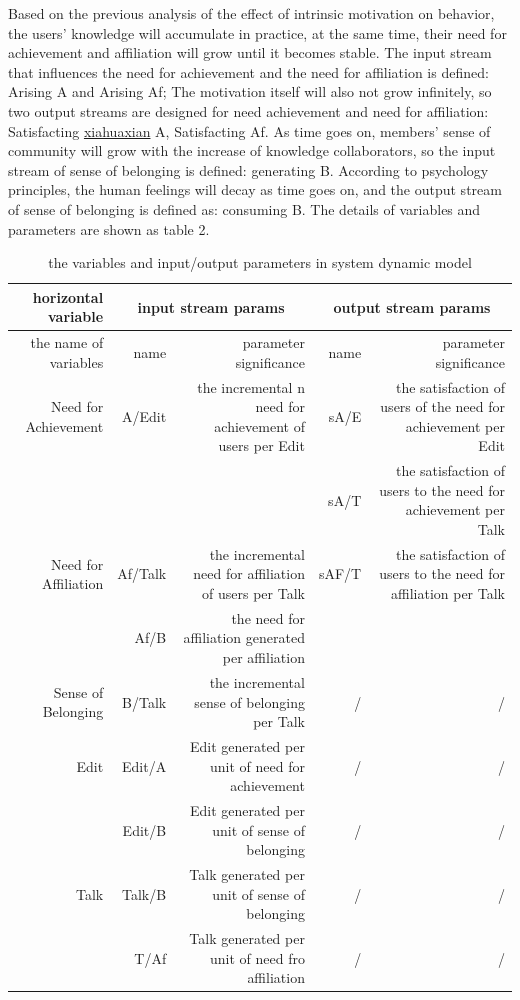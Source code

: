 \documentclass{elsarticle}
\begin{document}
Based on the previous analysis of the effect of intrinsic motivation
on behavior, the users’ knowledge will accumulate in practice, at the
same time, their need for achievement and affiliation will grow until
it becomes stable. The input stream that influences the need for
achievement and the need for affiliation is defined: Arising A and
Arising Af; The motivation itself will also not grow infinitely, so
two output streams are designed for need achievement and need for
affiliation: Satisfacting \underline{xiahuaxian} A, Satisfacting Af. As time goes on,
members’ sense of community will grow with the increase of knowledge
collaborators, so the input stream of sense of belonging is defined:
generating B. According to psychology principles, the human feelings
will decay as time goes on, and the output stream of sense of
belonging is defined as: consuming B. The details of variables and
parameters are shown as table 2. 
\begin{table}[htpb]
  \centering
 
  \caption{ the variables and input/output parameters in system
    dynamic model}
\begin{tabular}{rrrrr}
   
    \toprule
    horizontal variable & \multicolumn{ 2}{|c}{input stream params} &
    \multicolumn{ 2}{|c}{output stream params} \\
    \midrule
    the name of variables & name  & parameter significance & name  & parameter significance \\
    \multicolumn{ 1}{|r|}{Need for Achievement} & \multicolumn{ 1}{|r}{A/Edit} & \multicolumn{ 1}{r|}{the incremental n need for achievement of users per Edit} & sA/E  & the satisfaction of users of the need for achievement per Edit \\
    \multicolumn{ 1}{|r|}{} & \multicolumn{ 1}{|r}{} & \multicolumn{ 1}{r|}{} & sA/T  & the satisfaction of users to the need for achievement per Talk \\
    \multicolumn{ 1}{|r|}{Need for Affiliation} & Af/Talk & the incremental need for affiliation of users per Talk & \multicolumn{ 1}{|r}{sAF/T} & \multicolumn{ 1}{r|}{the satisfaction of users to the need for affiliation per Talk} \\
    \multicolumn{ 1}{|r|}{} & Af/B  & the need for affiliation generated per affiliation & \multicolumn{ 1}{|r}{} & \multicolumn{ 1}{r|}{} \\
    Sense of Belonging & B/Talk & the incremental sense of belonging per Talk & /     & / \\
    \multicolumn{ 1}{|r|}{Edit} & Edit/A & Edit generated per unit of need for achievement & /     & / \\
    \multicolumn{ 1}{|r|}{} & Edit/B & Edit generated per unit of sense of belonging & /     & / \\
    \multicolumn{ 1}{|r|}{Talk} & Talk/B & Talk generated per unit of sense of belonging & /     & / \\
    \multicolumn{ 1}{|r|}{} & T/Af  & Talk generated per unit of need fro affiliation & /     & / \\
    \bottomrule
    \end{tabular}
\end{table}
\end{document}
